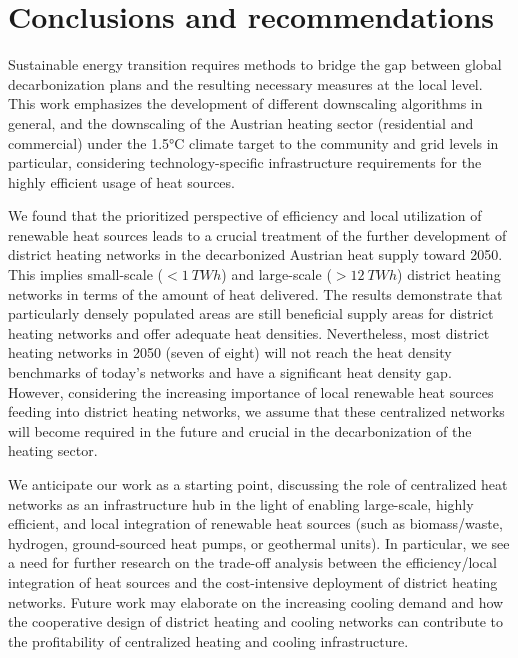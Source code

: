 \section{Conclusions and recommendations}\label{conclusions}
Sustainable energy transition requires methods to bridge the gap between global decarbonization plans and the resulting necessary measures at the local level. This work emphasizes the development of different downscaling algorithms in general, and the downscaling of the Austrian heating sector (residential and commercial) under the 1.5°C climate target to the community and grid levels in particular, considering technology-specific infrastructure requirements for the highly efficient usage of heat sources.\vspace{0.3cm}

We found that the prioritized perspective of efficiency and local utilization of renewable heat sources leads to a crucial treatment of the further development of district heating networks in the decarbonized Austrian heat supply toward 2050. This implies small-scale ($<\SI{1}{TWh}$) and large-scale ($>\SI{12}{TWh}$) district heating networks in terms of the amount of heat delivered. The results demonstrate that particularly densely populated areas are still beneficial supply areas for district heating networks and offer adequate heat densities. Nevertheless, most district heating networks in 2050 (seven of eight) will not reach the heat density benchmarks of today's networks and have a significant heat density gap. However, considering the increasing importance of local renewable heat sources feeding into district heating networks, we assume that these centralized networks will become required in the future and crucial in the decarbonization of the heating sector.\vspace{0.3cm}

We anticipate our work as a starting point, discussing the role of centralized heat networks as an infrastructure hub in the light of enabling large-scale, highly efficient, and local integration of renewable heat sources (such as biomass/waste, hydrogen, ground-sourced heat pumps, or geothermal units). In particular, we see a need for further research on the trade-off analysis between the efficiency/local integration of heat sources and the cost-intensive deployment of district heating networks. Future work may elaborate on the increasing cooling demand and how the cooperative design of district heating and cooling networks can contribute to the profitability of centralized heating and cooling infrastructure. 